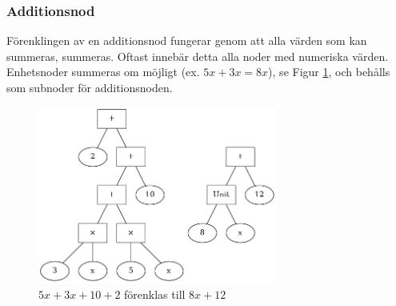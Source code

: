 \documentclass[12pt,a4paper]{article}
\begin{document}
\subsubsection{Additionsnod}
Förenklingen av en additionsnod fungerar genom att alla värden som kan summeras, summeras. Oftast innebär detta alla noder med numeriska värden. Enhetsnoder summeras om möjligt (ex. \(5x + 3x = 8x\)), se Figur \ref{fig:2321}, och behålls som subnoder för additionsnoden.
\begin{figure}[h!]
  \centering
  \includegraphics[width=0.7\textwidth]{image-merged2}
  \caption{\(5x + 3x + 10 + 2\) förenklas till \(8x + 12\)}
  \label{fig:2321}
\end{figure}
\end{document}
